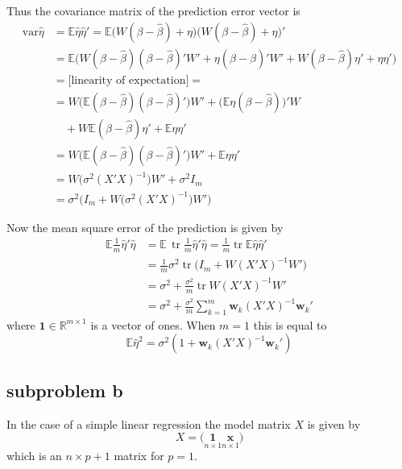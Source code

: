 \documentclass[a4paper]{article}
\newcommand{\w}{\mathbf{w}}
\newcommand{\e}{\mathbf{1}}
\newcommand{\Real}{\mathbb{R}}
\newcommand{\Ex}{\mathbb{E}}
\newcommand{\Var}{\text{var}}
\newcommand{\Tr}{\mathop{\text{tr}}\nolimits}
\begin{document}
Thus the covariance matrix of the prediction error vector is
\begin{align*}
	\Var \hat{\eta} &= \Ex \hat{\eta}\hat{\eta}'
	= \Ex\big(W (\beta - \hat{\beta}) + \eta\big)\big(W (\beta - \hat{\beta}) + \eta\big)'\\
	&= \Ex \big( W (\beta - \hat{\beta})(\beta - \hat{\beta})'W' + \eta (\beta - \hat{\beta})'W' + W (\beta - \hat{\beta}) \eta' + \eta \eta' \big)\\
	&= \Big[ \text{linearity of expectation} \Big] = \\
	&= W \big( \Ex (\beta - \hat{\beta})(\beta - \hat{\beta})' \big) W' + \big( \Ex \eta(\beta - \hat{\beta}) \big)'W \\
		& \quad + W \Ex(\beta - \hat{\beta}) \eta' + \Ex \eta \eta' \\
	&= W \big( \Ex (\beta - \hat{\beta})(\beta - \hat{\beta})' \big) W' + \Ex\eta\eta' \\
	&= W \big( \sigma^2 (X'X)^{-1} \big) W' + \sigma^2 I_m \\
	&= \sigma^2 \Big( I_m + W \big( \sigma^2 (X'X)^{-1} \big) W' \Big)
\end{align*}

Now the mean square error of the prediction is given by
\begin{align*}
	\Ex \frac{1}{m}\hat{\eta}' \hat{\eta}
	&= \Ex\, \Tr \frac{1}{m} \hat{\eta}'\hat{\eta} 
	 = \frac{1}{m} \Tr \Ex \hat{\eta} \hat{\eta}' \\
	&= \frac{1}{m} \sigma^2 \Tr \big( I_m + W (X'X)^{-1} W' ) \\
	&= \sigma^2 + \frac{\sigma^2}{m} \Tr W (X'X)^{-1} W' \\
	&= \sigma^2 + \frac{\sigma^2}{m} \sum_{k=1}^m \w_k (X'X)^{-1} \w_k'
\end{align*}
where $\e\in \Real^{m\times 1}$ is a vector of ones. When $m=1$ this is equal to
\[ \Ex \hat{\eta}^2 = \sigma^2( 1 + \w_k (X'X)^{-1} \w_k' ) \]


\subsection{subproblem b} %
\label{sub:subproblem_b}

In the case of a simple linear regression the model matrix $X$ is given by
\[X = \big( \underset{n\times 1}{\e} \underset{n\times 1}{\mathbf{x}} \big)\]
which is an $n\times p+1$ matrix for $p=1$.
\end{document}
